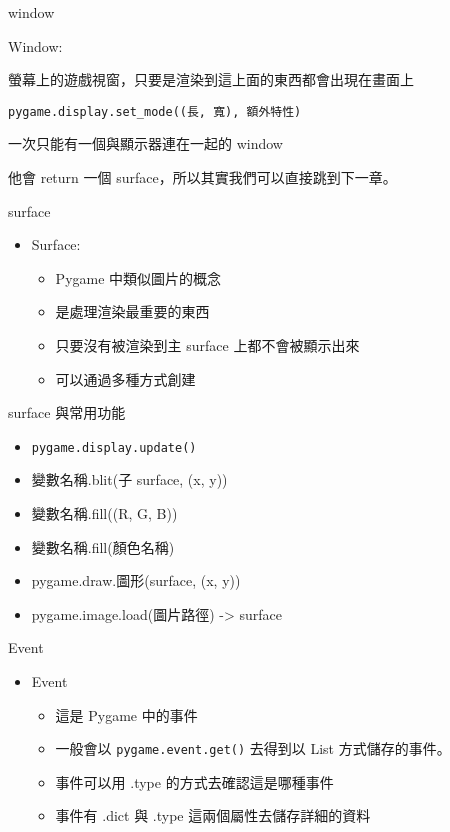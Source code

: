 \newpage

\begin{mainpage}{2}{window}
\vfill
\begin{description}
\item Window:
\item[含義：] 螢幕上的遊戲視窗，只要是渲染到這上面的東西都會出現在畫面上
\item[創建：] \verb|pygame.display.set_mode((長, 寬), 額外特性)|
\item[限制：] 一次只能有一個與顯示器連在一起的 window
\item[小知識：] 他會 return 一個 surface，所以其實我們可以直接跳到下一章。
\end{description}
\end{mainpage}
\newpage

\begin{mainpage}{3}{surface}
\vfill
\begin{itemize}
\item Surface:
\begin{itemize}
\item Pygame 中類似圖片的概念
\item 是處理渲染最重要的東西
\item 只要沒有被渲染到主 surface 上都不會被顯示出來
\item 可以通過多種方式創建
\end{itemize}
\end{itemize}
\end{mainpage}
\newpage

\begin{mainpage}{3}{surface 與常用功能}
\vfill
\begin{itemize}
\item \verb|pygame.display.update()|
\item 變數名稱.blit(子 surface, (x, y))
\item 變數名稱.fill((R, G, B))
\item 變數名稱.fill(顏色名稱)
\item pygame.draw.圖形(surface, (x, y))
\item pygame.image.load(圖片路徑) -> surface
\end{itemize}
\end{mainpage}
\newpage

\begin{mainpage}{4}{Event}
\vfill
\begin{itemize}
\item Event
\begin{itemize}
\item 這是 Pygame 中的事件
\item 一般會以 \verb|pygame.event.get()| 去得到以 List 方式儲存的事件。
\item 事件可以用 .type 的方式去確認這是哪種事件
\item 事件有 .dict 與 .type 這兩個屬性去儲存詳細的資料
\end{itemize}
\end{itemize}
\end{mainpage}
\newpage

